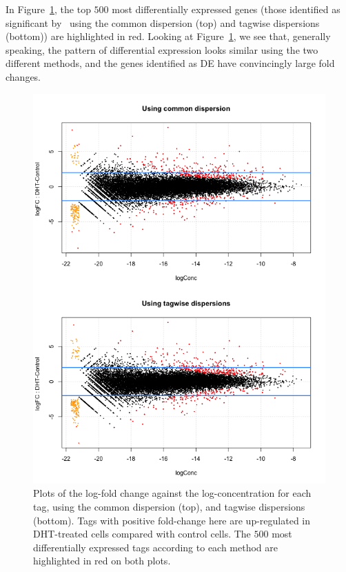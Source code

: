 In Figure~\ref{fig:Li_FC2}, the top $500$ most differentially
expressed genes (those identified as significant by \edgeR~using the
common dispersion (top) and tagwise dispersions (bottom)) are
highlighted in red. Looking at Figure~\ref{fig:Li_FC2}, we see that,
generally speaking, the pattern of differential expression looks
similar using the two different methods, and the genes identified as
DE have convincingly large fold changes.

\begin{figure}[ht]
\begin{center}
\includegraphics[height=0.8\textheight]{edgeR_case_study_Li-032.png}
\caption{Plots of the log-fold change against the log-concentration
  for each tag, using the common dispersion (top), and tagwise
  dispersions (bottom). Tags with positive fold-change here are
  up-regulated in DHT-treated cells compared with control cells. The
  $500$ most differentially expressed tags according to each method
  are highlighted in red on both plots.}
\label{fig:Li_FC2}
\end{center}
\end{figure}

